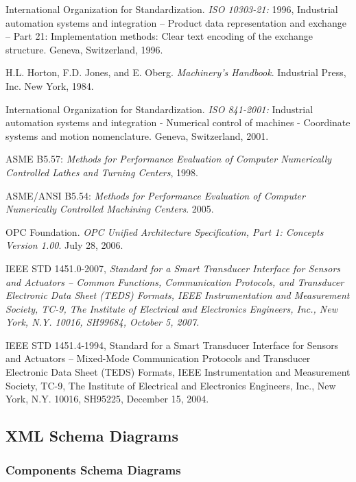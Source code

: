 International Organization for Standardization. \textit{ISO 10303-21:} 1996, Industrial automation systems and integration -- Product data representation and exchange -- Part 21: Implementation methods: Clear text encoding of the exchange structure. Geneva, Switzerland, 1996.

H.L. Horton, F.D. Jones, and E. Oberg. \textit{Machinery's Handbook}. Industrial Press, Inc. New York, 1984.

International Organization for Standardization. \textit{ISO 841-2001:} Industrial automation systems and integration - Numerical control of machines - Coordinate systems and motion nomenclature. Geneva, Switzerland, 2001.

ASME B5.57: \textit{Methods for Performance Evaluation of Computer Numerically Controlled Lathes and Turning Centers}, 1998.

ASME/ANSI B5.54: \textit{Methods for Performance Evaluation of Computer Numerically Controlled Machining Centers}. 2005.

OPC Foundation. \textit{OPC Unified Architecture Specification, Part 1: Concepts Version 1.00}. July 28, 2006.

IEEE STD 1451.0-2007, \textit{Standard for a Smart Transducer Interface for Sensors and Actuators – Common Functions, Communication Protocols, and Transducer Electronic Data Sheet (TEDS) Formats, IEEE Instrumentation and Measurement Society, TC-9, The Institute of Electrical and Electronics Engineers, Inc., New York, N.Y. 10016, SH99684, October 5, 2007.}

IEEE STD 1451.4-1994, Standard for a Smart Transducer Interface for Sensors and Actuators – Mixed-Mode Communication Protocols and Transducer Electronic Data Sheet (TEDS) Formats, IEEE Instrumentation and Measurement Society, TC-9, The Institute of Electrical and Electronics Engineers, Inc., New York, N.Y. 10016, SH95225, December 15, 2004. \newpage 

\subsection{XML Schema Diagrams}
\label{sec:XML Schema Diagrams}

\subsubsection{Components Schema Diagrams}
\label{sec:Components Schema Diagrams}

